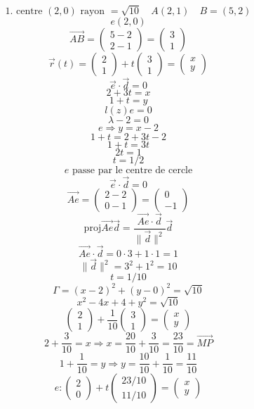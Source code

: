 \documentclass{article}
\begin{document}
\[
\text{1. centre } (2,0) \text{ rayon } = \sqrt{10} \quad A(2,1) \quad B=(5,2)
\]
\[
e(2,0)
\]
\[
\vec{AB} = \begin{pmatrix} 5-2 \\ 2-1 \end{pmatrix} = \begin{pmatrix} 3 \\ 1 \end{pmatrix}
\]
\[
\vec{r}(t) = \begin{pmatrix} 2 \\ 1 \end{pmatrix} + t \begin{pmatrix} 3 \\ 1 \end{pmatrix} = \begin{pmatrix} x \\ y \end{pmatrix}
\]
\[
\vec{e} \cdot \vec{d} = 0
\]
\[
2+3t = x
\]
\[
1+t = y
\]
\[
l(z) e = 0
\]
\[
\lambda - 2 = 0
\]
\[
e \Rightarrow y = x-2
\]
\[
1+t = 2+3t-2
\]
\[
1+t = 3t
\]
\[
2t = 1
\]
\[
t = 1/2
\]
\[
e \text{ passe par le centre de cercle}
\]
\[
\vec{e} \cdot \vec{d} = 0
\]
\[
\vec{Ae} = \begin{pmatrix} 2-2 \\ 0-1 \end{pmatrix} = \begin{pmatrix} 0 \\ -1 \end{pmatrix}
\]
\[
\text{proj} \vec{Ae} \vec{d} = \frac{\vec{Ae} \cdot \vec{d}}{\|\vec{d}\|^2} \vec{d}
\]
\[
\vec{Ae} \cdot \vec{d} = 0 \cdot 3 + 1 \cdot 1 = 1
\]
\[
\|\vec{d}\|^2 = 3^2+1^2 = 10
\]
\[
t = 1/10
\]
\[
\Gamma = (x-2)^2+(y-0)^2 = \sqrt{10}
\]
\[
x^2-4x+4+y^2 = \sqrt{10}
\]
\[
\begin{pmatrix} 2 \\ 1 \end{pmatrix} + \frac{1}{10} \begin{pmatrix} 3 \\ 1 \end{pmatrix} = \begin{pmatrix} x \\ y \end{pmatrix}
\]
\[
2 + \frac{3}{10} = x \Rightarrow x = \frac{20}{10} + \frac{3}{10} = \frac{23}{10} = \vec{MP}
\]
\[
1 + \frac{1}{10} = y \Rightarrow y = \frac{10}{10} + \frac{1}{10} = \frac{11}{10}
\]
\[
e: \begin{pmatrix} 2 \\ 0 \end{pmatrix} + t \begin{pmatrix} 23/10 \\ 11/10 \end{pmatrix} = \begin{pmatrix} x \\ y \end{pmatrix}
\]
\end{document}
